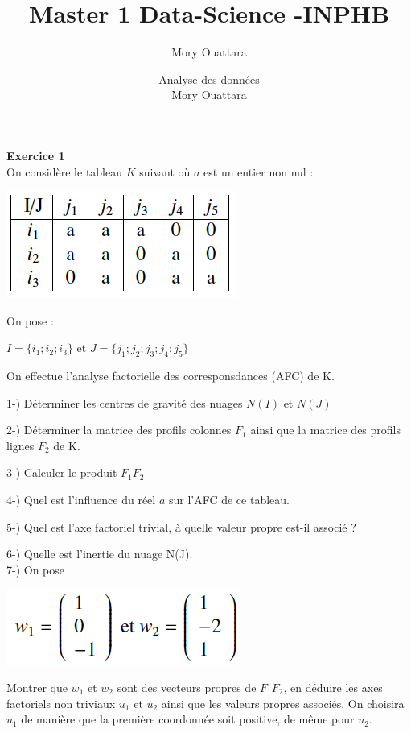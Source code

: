 \documentclass[16pt,a4paper]{article}
\author{Mory Ouattara}
\title{Master 1 Data-Science -INPHB }
\author{Analyse des données\\
Mory Ouattara}
\date{}
\begin{document}
\maketitle 
\thispagestyle{empty}

 \textbf{Exercice 1} \\
 
 On considère le tableau $K$ suivant où $a$ est un entier non nul :
 
  \includegraphics[scale=0.8]{SC1} 
  
  On pose : 

$I =\{i_1; i_2; i_3\}$ et $J = \{ j_1; j_2; j_3; j_4; j_5\}$

On effectue l'analyse factorielle des corresponsdances (AFC) de K.
 
 1-) Déterminer les centres de gravité des nuages $N(I)$ et $N(J)$
 
 2-) Déterminer la matrice des profils colonnes $F_1$ ainsi que la matrice des profils lignes $F_2$ de K.
 
 3-) Calculer le produit $F_1F_2$  
 
 4-) Quel est l’influence du réel $a$ sur l’AFC de ce tableau. 
 
 5-) Quel est l’axe factoriel trivial, à quelle valeur propre est-il associé ?
 
 6-) Quelle est l'inertie du nuage N(J).\\
 
 7-) On pose
  
  \includegraphics[scale=0.5]{SC2} 
  
 Montrer que $w_1$ et $w_2$ sont des vecteurs propres de $F_1F_2$, en déduire les axes factoriels non triviaux $u_1$ et $u_2$ ainsi que les valeurs propres associés. On choisira $u_1$ de manière
que la première coordonnée soit positive, de même pour $u_2$.
 
\end{document}
